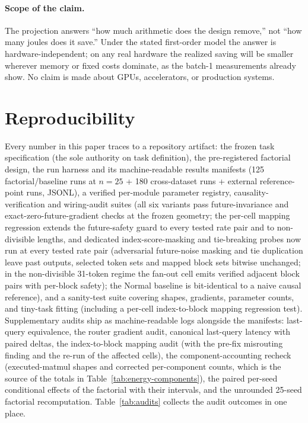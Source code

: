 \paragraph{Scope of the claim.} The projection answers ``how much
arithmetic does the design remove,'' not ``how many joules does it save.''
Under the stated first-order model the answer is hardware-independent; on
any real hardware the realized saving will be smaller wherever memory or
fixed costs dominate, as the batch-1 measurements already show. No claim
is made about GPUs, accelerators, or production systems.

\section{Reproducibility}
\label{sec:appendix-repro}
Every number in this paper traces to a repository artifact: the frozen task
specification (the sole authority on task definition), the pre-registered
factorial design, the run harness and its machine-readable results manifests
(125 factorial/baseline runs at $n{=}25$ + 180 cross-dataset runs + external
reference-point runs, JSONL), a verified
per-module parameter registry, causality-verification and wiring-audit
suites (all six variants pass future-invariance and exact-zero-future-gradient
checks at the frozen geometry; the per-cell mapping regression extends the
future-safety guard to every tested rate pair and to non-divisible lengths, and
dedicated index-score-masking and tie-breaking probes now run at every tested rate
pair (adversarial future-noise masking and tie duplication leave past outputs,
selected token sets and mapped block sets bitwise unchanged; in the non-divisible
31-token regime the fan-out cell emits verified adjacent block pairs with
per-block safety); the Normal baseline is bit-identical to a naive causal reference),
and a sanity-test suite covering shapes, gradients, parameter counts, and
tiny-task fitting (including a per-cell index-to-block mapping regression test).
Supplementary audits ship as machine-readable logs alongside the manifests: last-query
equivalence, the router gradient audit, canonical last-query latency with paired
deltas, the index-to-block mapping audit (with the pre-fix misrouting finding and
the re-run of the affected cells), the component-accounting recheck (executed-matmul
shapes and corrected per-component counts, which is the source of the totals in
Table~\ref{tab:energy-components}), the paired per-seed conditional effects of the
factorial with their intervals, and the unrounded 25-seed factorial
recomputation. Table~\ref{tab:audits} collects the audit outcomes in one place.

